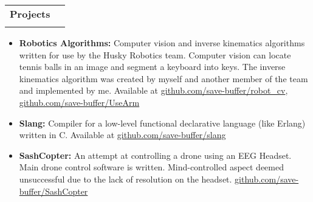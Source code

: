 \documentclass[letterpaper,11pt]{article}
\makeatletter
\newcommand{\resumeItem}[2]{
\item\small{
    \textbf{#1}{\textbf{:} #2 \vspace{-2pt}}
  }
}
\newcommand{\resumeSubheading}[4]{
  \vspace{8pt}
  \begin{tabular*}{0.97\textwidth}{l@{\extracolsep{\fill}}r}
    \textbf{#1} & #2 \\
    {\small#3} & {\small #4} \\
  \end{tabular*}\vspace{-5pt}
}
\newcommand{\resumeSubHeadingListEnd}{}
\newcommand{\resumeItemListStart}{\begin{itemize}}
\newcommand{\resumeItemListEnd}{\end{itemize}\vspace{-5pt}}
\makeatother
\begin{document}
\resumeSubheading
{\color{lightblue}Projects}{}
{}{}
\vspace{-8pt}
\resumeItemListStart
\resumeItem{Robotics Algorithms}
{Computer vision and inverse kinematics algorithms written for use by the Husky Robotics
  team. Computer vision can locate tennis balls in an image and segment a keyboard into
  keys. The inverse kinematics algorithm was created by myself and another member of the
  team and implemented by me. Available at
  \href{https://github.com/save-buffer/robot\_cv}{github.com/save-buffer/robot\_cv},
  \href{https://github.com/save-buffer/UseArm}{github.com/save-buffer/UseArm}}
\resumeItem{Slang}
{Compiler for a low-level functional declarative language (like Erlang) written in C.
Available at \href{https://github.com/save-buffer/slang}{github.com/save-buffer/slang}}
\resumeItem{SashCopter}
{An attempt at controlling a drone using an EEG Headset. Main drone control software is
  written. Mind-controlled aspect deemed unsuccessful due to the lack of resolution on
  the headset.  
  \href{https://www.github.com/save-buffer/SashCopter}{github.com/save-buffer/SashCopter}}
\resumeItemListEnd
\resumeSubHeadingListEnd
\end{document}
